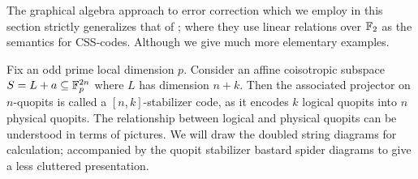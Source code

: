 The graphical algebra approach to error correction which we employ in this section strictly generalizes that of \cite{grok}; where they use linear relations over $\mathbb{F}_2$ as the semantics for CSS-codes. Although we give much more elementary examples.

Fix an odd prime local dimension  $p$.
Consider an affine coisotropic subspace $S=L+a \subseteq \mathbb{F}_p^{2n}$ where $L$ has dimension $n+k$.  Then the associated projector on $n$-quopits is called a $[n,k]$-stabilizer code, as it encodes $k$ logical quopits into $n$ physical quopits. 
The relationship between logical and physical quopits can be understood in terms of pictures.  We will draw the doubled string diagrams for calculation; accompanied by the quopit stabilizer bastard spider diagrams to give a less cluttered presentation.

